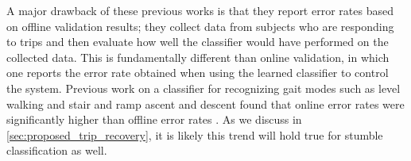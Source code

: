 A major drawback of these previous works is that they report error rates based
on offline validation results; \ie they collect data from subjects who are
responding to trips and then evaluate how well the classifier would have
performed on the collected data. This is fundamentally different than online
validation, in which one reports the error rate obtained when using the
learned classifier to control the system. Previous work on a classifier for
recognizing gait modes such as level walking and stair and ramp ascent and
descent found that online error rates were significantly higher than offline
error rates \citep{hargrove2015intuitive}. As we discuss in
\cref{sec:proposed_trip_recovery}, it is likely this trend will hold true for
stumble classification as well.
